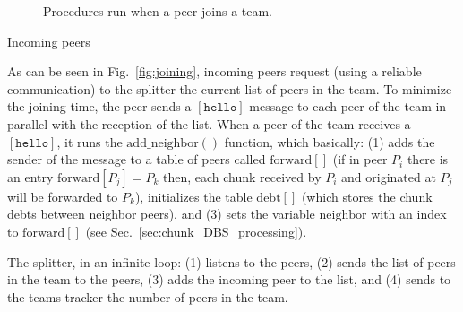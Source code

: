 \label{sec:joining_a_tean}
\begin{figure*}
   \caption{Procedures run when a peer
    joins a team.\label{fig:joining_a_team}}
\end{figure*}

Incoming peers 

As can be seen in Fig.~\ref{fig:joining}, incoming peers request
(using a reliable communication) to the splitter the current list of
peers in the team. To minimize the joining time, the peer sends a
$[\mathtt{hello}]$ message to each peer of the team in parallel with
the reception of the list. When a peer of the team receives a
$[\mathtt{hello}]$, it runs the $\mathrm{add}\_\mathrm{neighbor}()$
function, which basically: (1) adds the sender of the message to a
table of peers called $\mathrm{forward}[]$ (if in peer $P_i$ there is
an entry $\mathrm{forward}[P_j]=P_k$ then, each chunk received by
$P_i$ and originated at $P_j$ will be forwarded to $P_k$), initializes
the table $\mathrm{debt}[]$ (which stores the chunk debts between
neighbor peers), and (3) sets the variable $\mathrm{neighbor}$ with an
index to $\mathrm{forward}[]$ (see
Sec.~\ref{sec:chunk_DBS_processing}).

The splitter, in an infinite loop: (1) listens to the peers, (2) sends
the list of peers in the team to the peers, (3) adds the incoming peer
to the list, and (4) sends to the teams tracker the number of peers
in the team.
